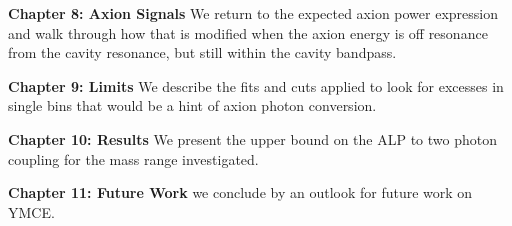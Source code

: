 \documentclass[12pt,twosides]{book}
\begin{document}
\textbf{Chapter 8: Axion Signals} We return to the expected axion power expression and walk through how that is modified when the axion energy is off resonance from the cavity resonance, but still within the cavity bandpass.

\textbf{Chapter 9:  Limits} We describe the fits and cuts applied to look for excesses in single bins that would be a hint of axion photon conversion.

\textbf{Chapter 10: Results} We present the upper bound on the ALP to two photon coupling for the mass range investigated.

\textbf{Chapter 11: Future Work} we conclude by an outlook for future work on YMCE.



\end{document}
